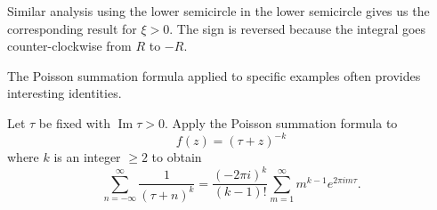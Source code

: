 \documentclass[12 pt, letterpaper]{hmcpset}
\begin{document}
\begin{solution}
	Similar analysis using the lower semicircle in the lower semicircle gives us the corresponding result for $\xi > 0$. The sign is reversed because the integral goes counter-clockwise from $R$ to $-R$.
\end{solution}

\pagebreak

\begin{problem}[7. (a)]
	The Poisson summation formula applied to specific examples often provides interesting identities.

	Let $\tau$ be fixed with $\operatorname{Im} \tau > 0$. Apply the Poisson summation formula to
	\[
		f(z) = (\tau + z)^{-k}
	\]
	where $k$ is an integer $\ge 2$ to obtain
	\[
		\sum_{n = -\infty}^{\infty} \frac{1}{(\tau + n)^{k}} = \frac{(-2 \pi i)^{k}}{(k - 1)!} \sum_{m = 1}^{\infty} m^{k - 1} e^{2 \pi i m \tau}.
	\]
\end{problem}
\end{document}
